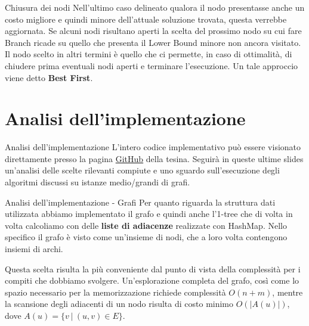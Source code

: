 \documentclass[10pt]{beamer}
\begin{document}
    \begin{frame}{Chiusura dei nodi}
        Nell'ultimo caso delineato qualora il nodo presentasse anche un costo migliore e quindi minore dell'attuale soluzione trovata, questa verrebbe aggiornata.
        \newline
        \newline
        Se alcuni nodi risultano aperti la scelta del prossimo nodo su cui fare Branch ricade su quello che presenta il Lower Bound minore non ancora visitato.\newline
        Il nodo scelto in altri termini è quello che ci permette, in caso di ottimalità, di chiudere prima eventuali nodi aperti e terminare l'esecuzione.
        Un tale approccio viene detto \textbf{Best First}.
    \end{frame}


    \section{Analisi dell'implementazione}\label{sec:analisi-dell'implementazione}
    \begin{frame}{Analisi dell'implementazione}
        L'intero codice implementativo può essere visionato direttamente presso la pagina \href{https://github.com/LorenzoSciandra/TesinaOttimizzazioneCombinatoria}{GitHub} della tesina.
        Seguirà in queste ultime slides un'analisi delle scelte rilevanti compiute e uno sguardo sull'esecuzione degli algoritmi discussi su istanze medio/grandi di grafi.
    \end{frame}

    \begin{frame}{Analisi dell'implementazione - Grafi}
        Per quanto riguarda la struttura dati utilizzata abbiamo implementato il grafo e quindi anche l'1-tree che di volta in volta calcoliamo con delle \textbf{liste di adiacenze} realizzate con HashMap.\newline
        Nello specifico il grafo è visto come un'insieme di nodi, che a loro volta contengono insiemi di archi.

        Questa scelta risulta la più conveniente dal punto di vista della complessità per i compiti che dobbiamo svolgere.
        Un'esplorazione completa del grafo, così come lo spazio necessario per la memorizzazione richiede complessità $O(n+m)$, mentre la scansione degli adiacenti di un nodo risulta di costo minimo $O(|A(u)|)$, dove $A(u) = \{v \:|\: (u,v) \in E\}$.
    \end{frame}
\end{document}
